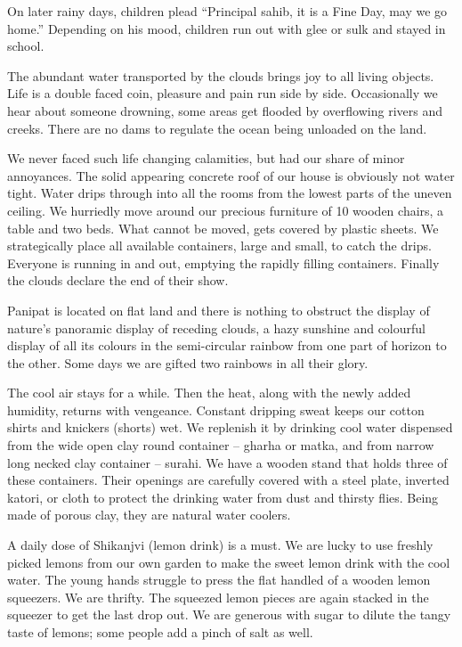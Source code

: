 On later rainy days, children plead “Principal sahib, it is a Fine Day,
may we go home.” Depending on his mood, children run out with glee or sulk
and stayed in school. 
 
The abundant water transported by the clouds brings joy to all living
objects. Life is a double faced coin, pleasure and pain run side by side.
Occasionally we hear about someone drowning, some areas get flooded by
overflowing rivers and creeks. There are no dams to regulate the ocean
being unloaded on the land. 

We never faced such life changing calamities, but had our share of minor
annoyances. The solid appearing concrete roof of our house is obviously
not water tight. Water drips through into all the rooms from the lowest
parts of the uneven ceiling. We hurriedly move around our precious
furniture of 10 wooden chairs, a table and two beds. What cannot be moved,
gets covered by plastic sheets. We strategically place all available
containers, large and small, to catch the drips. Everyone is running in
and out, emptying the rapidly filling containers. Finally the clouds
declare the end of their show. 

Panipat is located on flat land and there is nothing to obstruct the
display of nature's panoramic display of receding clouds, a hazy sunshine
and colourful display of all its colours in the semi-circular rainbow from
one part of horizon to the other. Some days we are gifted two rainbows in
all their glory. 
 
The cool air stays for a while. Then the heat, along with the newly added
humidity, returns with vengeance. Constant dripping sweat keeps our cotton
shirts and knickers (shorts) wet. We replenish it by drinking cool water
dispensed from the wide open clay round container – gharha or matka, and
from narrow long necked clay container – surahi. We have a wooden stand
that holds three of these containers. Their openings are carefully covered
with a steel plate, inverted katori, or cloth to protect the drinking
water from dust and thirsty flies. Being made of porous clay, they are
natural water coolers. 
 
A daily dose of Shikanjvi (lemon drink) is a must. We are lucky to use
freshly picked lemons from our own garden to make the sweet lemon drink
with the cool water. The young hands struggle to press the flat handled of
a wooden lemon squeezers. We are thrifty. The squeezed lemon pieces are
again stacked in the squeezer to get the last drop out. We are generous
with sugar to dilute the tangy taste of lemons; some people add a pinch of
salt as well. 
 
